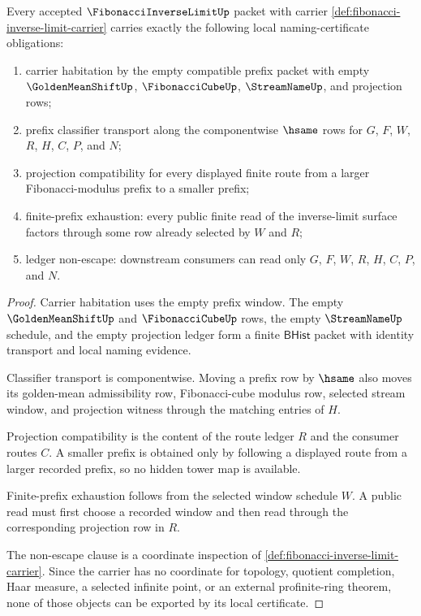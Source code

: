 \begin{theorem}
\label{thm:fibonacci-inverse-limit-namecert-obligations}
Every accepted $\FibonacciInverseLimitUp$ packet with carrier \autoref{def:fibonacci-inverse-limit-carrier} carries exactly the following local naming-certificate obligations:
\begin{enumerate}
\item carrier habitation by the empty compatible prefix packet with empty $\GoldenMeanShiftUp$, $\FibonacciCubeUp$, $\StreamNameUp$, and projection rows;
\item prefix classifier transport along the componentwise $\hsame$ rows for $G$, $F$, $W$, $R$, $H$, $C$, $P$, and $N$;
\item projection compatibility for every displayed finite route from a larger Fibonacci-modulus prefix to a smaller prefix;
\item finite-prefix exhaustion: every public finite read of the inverse-limit surface factors through some row already selected by $W$ and $R$;
\item ledger non-escape: downstream consumers can read only $G$, $F$, $W$, $R$, $H$, $C$, $P$, and $N$.
\end{enumerate}
\end{theorem}
\begin{proof}
Carrier habitation uses the empty prefix window. The empty $\GoldenMeanShiftUp$ and $\FibonacciCubeUp$ rows, the empty $\StreamNameUp$ schedule, and the empty projection ledger form a finite $\mathsf{BHist}$ packet with identity transport and local naming evidence.

Classifier transport is componentwise. Moving a prefix row by $\hsame$ also moves its golden-mean admissibility row, Fibonacci-cube modulus row, selected stream window, and projection witness through the matching entries of $H$.

Projection compatibility is the content of the route ledger $R$ and the consumer routes $C$. A smaller prefix is obtained only by following a displayed route from a larger recorded prefix, so no hidden tower map is available.

Finite-prefix exhaustion follows from the selected window schedule $W$. A public read must first choose a recorded window and then read through the corresponding projection row in $R$.

The non-escape clause is a coordinate inspection of \autoref{def:fibonacci-inverse-limit-carrier}. Since the carrier has no coordinate for topology, quotient completion, Haar measure, a selected infinite point, or an external profinite-ring theorem, none of those objects can be exported by its local certificate.
\end{proof}

